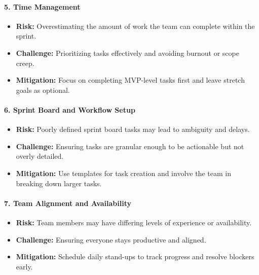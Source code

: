 \documentclass{article}
\begin{document}
\paragraph{5. Time Management}
\begin{itemize}
    \item \textbf{Risk:} Overestimating the amount of work the team can complete within the sprint.
    \item \textbf{Challenge:} Prioritizing tasks effectively and avoiding burnout or scope creep.
    \item \textbf{Mitigation:} Focus on completing MVP-level tasks first and leave stretch goals as optional.
\end{itemize}

\paragraph{6. Sprint Board and Workflow Setup}
\begin{itemize}
    \item \textbf{Risk:} Poorly defined sprint board tasks may lead to ambiguity and delays.
    \item \textbf{Challenge:} Ensuring tasks are granular enough to be actionable but not overly detailed.
    \item \textbf{Mitigation:} Use templates for task creation and involve the team in breaking down larger tasks.
\end{itemize}

\paragraph{7. Team Alignment and Availability}
\begin{itemize}
    \item \textbf{Risk:} Team members may have differing levels of experience or availability.
    \item \textbf{Challenge:} Ensuring everyone stays productive and aligned.
    \item \textbf{Mitigation:} Schedule daily stand-ups to track progress and resolve blockers early.
\end{itemize}
\end{document}
